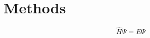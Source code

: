 \section{Methods}
\label{chap3:methods}

\begin{equation}
\hat{H} \Psi = E \Psi
\label{chap3:eq:SE}
\end{equation}


